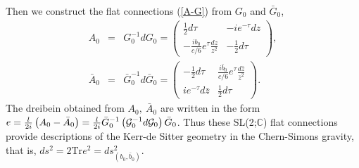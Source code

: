 \documentclass[a4paper,11pt]{article}
\begin{document}
Then we construct the flat connections (\ref{A-G}) from $G_0$ and $\bar{G}_0$,
\begin{eqnarray}
\label{A_0}
A_0 &=& G_0^{-1}dG_0 =
  \left(\begin{array}{cc}
   \frac{1}{2}d\tau & -ie^{-\tau}dz \\
   -\frac{ib_0}{c/6}e^{\tau}\frac{dz}{z^2} & -\frac{1}{2}d\tau 
       \end{array}\right), \nonumber \\
\bar{A}_0 &=& \bar{G}_0^{-1}d\bar{G}_0 =
  \left(\begin{array}{cc}
   -\frac{1}{2}d\tau & 
      \frac{i\bar{b}_0}{c/6}e^{\tau}\frac{d\bar{z}}{\bar{z}^2} \\
   ie^{-\tau}d\bar{z} & \frac{1}{2}d\tau 
       \end{array}\right).
\end{eqnarray}
The dreibein obtained from $A_0, \ \bar{A}_0$ are written in the form 
$e=\frac{l}{2i}\left(A_0-\bar{A}_0\right)
  =\frac{l}{2i}\bar{G}_0^{-1}\left({\cal G}_0^{-1}d{\cal G}_0\right)\bar{G}_0$.
Thus these SL(2;$\mathbb{C}$) flat connections provide descriptions 
of the Kerr-de Sitter geometry in the Chern-Simons gravity, that is,  
$ds^2=2 \mbox{Tr} e^2=ds^2_{(b_0, \bar{b}_0)}$.
\end{document}
